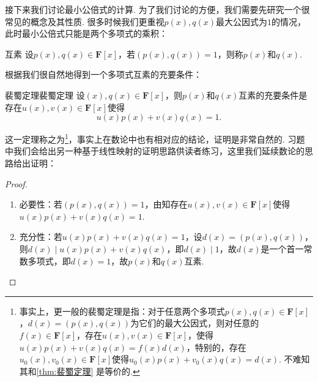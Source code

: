 接下来我们讨论最小公倍式的计算. 为了我们讨论的方便，我们需要先研究一个很常见的概念及其性质. 很多时候我们更重视$p(x),q(x)$最大公因式为$1$的情况，此时最小公倍式只能是两个多项式的乘积：
\begin{definition}{互素}{}
    设$p(x),q(x)\in\mathbf{F}[x]$，若$(p(x),q(x))=1$，则称$p(x)$和$q(x)$.
\end{definition}
根据我们很自然地得到一个多项式互素的充要条件：
\begin{theorem}{裴蜀定理}{裴蜀定理} 
    设$(x),q(x)\in\mathbf{F}[x]$，则$p(x)$和$q(x)$互素的充要条件是存在$u(x),v(x)\in\mathbf{F}[x]$使得\[u(x)p(x)+v(x)q(x)=1.\]
\end{theorem}
这一定理称之为\footnote{事实上，更一般的裴蜀定理是指：对于任意两个多项式$p(x),q(x)\in\mathbf{F}[x]$，$d(x)=(p(x),q(x))$为它们的最大公因式，则对任意的$f(x)\in\mathbf{F}[x]$，存在$u(x),v(x)\in\mathbf{F}[x]$，使得$u(x)p(x)+v(x)q(x)=f(x)d(x)$，特别的，存在$u_0(x),v_0(x)\in\mathbf{F}[x]$使得$u_0(x)p(x)+v_0(x)q(x)=d(x)$. 不难知其和\autoref{thm:裴蜀定理} 是等价的.}，事实上在数论中也有相对应的结论，证明是非常自然的. 习题中我们会给出另一种基于线性映射的证明思路供读者练习，这里我们延续数论的思路给出证明：
\begin{proof}
    \begin{enumerate}
        \item 必要性：若$(p(x),q(x))=1$，由知存在$u(x),v(x)\in\mathbf{F}[x]$使得$u(x)p(x)+v(x)q(x)=1$.
        \item 充分性：若$u(x)p(x)+v(x)q(x)=1$，设$d(x)=(p(x),q(x))$，则$d(x)\mid u(x)p(x)+v(x)q(x)$，即$d(x)\mid 1$，故$d(x)$是一个首一常数多项式，即$d(x)=1$，故$p(x)$和$q(x)$互素.
    \end{enumerate}
\end{proof}

